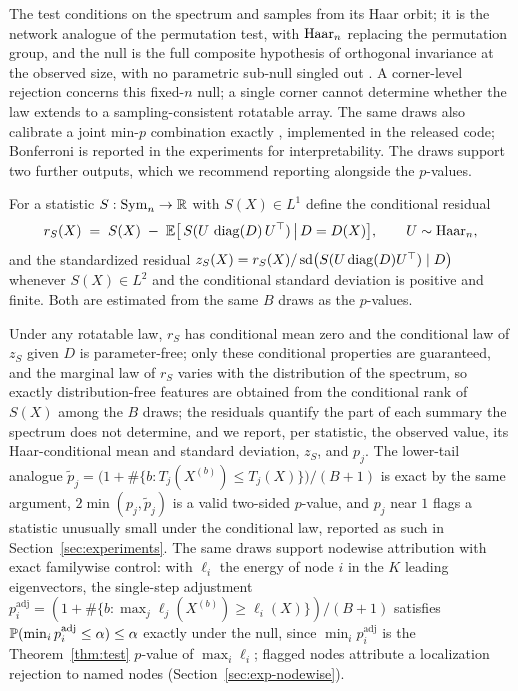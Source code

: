 The test conditions on the spectrum and samples from its Haar orbit;
it is the network analogue of the permutation test, with $\mathrm{Haar}_n$ replacing the permutation group, and the null is the full composite hypothesis of orthogonal invariance at
the observed size, with no parametric sub-null singled out
\citep{lehmann2005testing,dwass1957,hemerik2018exact}. A corner-level
rejection concerns this fixed-$n$ null; a single corner cannot
determine whether the law extends to a sampling-consistent rotatable
array. The same draws
also calibrate a joint min-$p$ combination exactly
\citep{hemerik2018exact}, implemented in the released code; Bonferroni
is reported in the experiments for interpretability. The draws support
two further outputs, which we recommend reporting alongside the
$p$-values.

\begin{definition}
\label{def:residual}
For a statistic $S:\mathrm{Sym}_n\to\mathbb{R}$ with $S(X)\in L^1$ define the
conditional residual
\[
r_S(X) \;=\; S(X)\;-\;\mathbb{E}\bigl[\,S(U\,\operatorname{diag}(D)\,U^\top)\,\big|\,
D=D(X)\bigr],\qquad U\sim\mathrm{Haar}_n,
\]
and the standardized residual
$z_S(X)=r_S(X)/\operatorname{sd}\bigl(S(U\operatorname{diag}(D)U^\top)\mid D\bigr)$
whenever $S(X)\in L^2$ and the conditional standard deviation is
positive and finite. Both are estimated
from the same $B$ draws as the $p$-values.
\end{definition}

Under any rotatable law, $r_S$ has conditional mean zero and the
conditional law of $z_S$ given $D$ is parameter-free; only these
conditional properties are guaranteed, and the marginal law of $r_S$
varies with the distribution of the spectrum, so exactly
distribution-free features are obtained from the conditional rank of
$S(X)$ among the $B$ draws; the residuals
quantify the part of each summary the spectrum does not determine, and
we report, per statistic, the observed value, its Haar-conditional
mean and standard deviation, $z_S$, and $p_j$. The lower-tail analogue
$\tilde p_j=\bigl(1+\#\{b:T_j(X^{(b)})\le T_j(X)\}\bigr)/(B+1)$ is
exact by the same argument, $2\min(p_j,\tilde p_j)$ is a valid
two-sided $p$-value, and $p_j$ near $1$ flags a statistic unusually
small under the conditional law, reported as such in
Section~\ref{sec:experiments}. The same draws support nodewise
attribution with exact familywise control: with $\ell_i$ the energy
of node $i$ in the $K$ leading eigenvectors, the single-step
adjustment
$p^{\mathrm{adj}}_i=(1+\#\{b:\max_j\ell_j(X^{(b)})\ge\ell_i(X)\})/(B+1)$
satisfies $\mathbb{P}(\min_ip^{\mathrm{adj}}_i\le\alpha)\le\alpha$ exactly
under the null, since $\min_ip^{\mathrm{adj}}_i$ is the
Theorem~\ref{thm:test} $p$-value of $\max_i\ell_i$; flagged nodes
attribute a localization rejection to named nodes
(Section~\ref{sec:exp-nodewise}).

